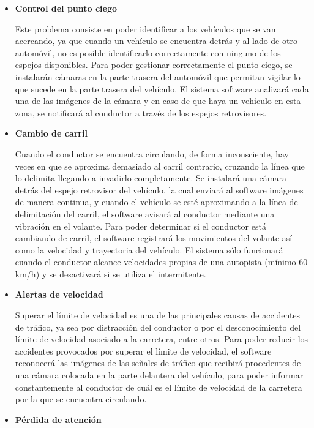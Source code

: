 \begin{itemize}[-]
\item \textbf{Control del punto ciego}
\par Este problema consiste en poder identificar a los vehículos que se van acercando, ya que cuando un vehículo se encuentra detrás y al lado de otro automóvil, no es posible identificarlo correctamente con ninguno de los espejos disponibles. Para poder gestionar correctamente el punto ciego, se instalarán cámaras en la parte trasera del automóvil que permitan vigilar lo que sucede en la parte trasera del vehículo. El sistema software analizará cada una de las imágenes de la cámara y en caso de que haya un vehículo en esta zona, se notificará al conductor a través de los espejos retrovisores.
\item \textbf{Cambio de carril}
\par Cuando el conductor se encuentra circulando, de forma inconsciente, hay veces en que se aproxima demasiado al carril contrario, cruzando la línea que lo delimita llegando a invadirlo completamente. Se instalará una cámara detrás del espejo retrovisor del vehículo, la cual enviará al software imágenes de manera continua, y cuando el vehículo se esté aproximando a la línea de delimitación del carril, el software avisará al conductor mediante una vibración en el volante. Para poder determinar si el conductor está cambiando de carril, el software registrará los movimientos del volante así como la velocidad y trayectoria del vehículo. El sistema sólo funcionará cuando el conductor alcance velocidades propias de una autopista (mínimo 60 km/h) y se desactivará si se utiliza el intermitente.
\item \textbf{Alertas de velocidad}
\par Superar el límite de velocidad es una de las principales causas de accidentes de tráfico, ya sea por distracción del conductor o por el desconocimiento del límite de velocidad asociado a la carretera, entre otros. Para poder reducir los accidentes provocados por superar el límite de velocidad, el software reconocerá las imágenes de las señales de tráfico que recibirá procedentes de una cámara colocada en la parte delantera del vehículo, para poder informar constantemente al conductor de cuál es el límite de velocidad de la carretera por la que se encuentra circulando.
\item \textbf{Pérdida de atención}

\end{itemize}
